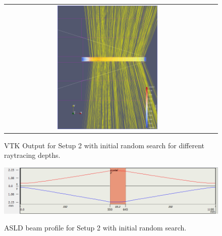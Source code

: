 \documentclass[a4paper,10pt]{article}
\begin{document}
\begin{figure}
\begin{tabular}{c c}
            \includegraphics[width=0.5\textwidth]{images/open_rand/4.png} \\
        \end{tabular}
        \label{fig:setup2_rand_depths}
        \caption[VTK Output for Setup 2 with initial random search for 
        different raytracing depths]{
            VTK Output for Setup 2 with initial random search for different 
            raytracing depths.
            }
    \end{figure}

    \begin{figure}
        \includegraphics[width=1.0\textwidth]{images/open_rand/beam.png} \\
        \label{fig:setup2_rand_beam}
        \caption[ASLD beam profile for Setup 2 with initial random search]{
            ASLD beam profile for Setup 2 with initial random search.
        }
    \end{figure}
\end{document}
